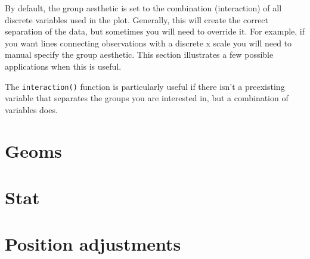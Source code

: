 By default, the group aesthetic is set to the combination (interaction) of all discrete variables used in the plot.  Generally, this will create the correct separation of the data, but sometimes you will need to override it.  For example, if you want lines connecting observations with a discrete x scale you will need to manual specify the group aesthetic.  This section illustrates a few possible applications when this is useful.

The {\tt interaction()} function is particularly useful if there isn't a preexisting variable that separates the groups you are interested in, but a combination of variables does.  

\section{Geoms}
\label{sec:geoms}

\section{Stat}
\label{sec:stat}

\section{Position adjustments}
\label{sec:position}





